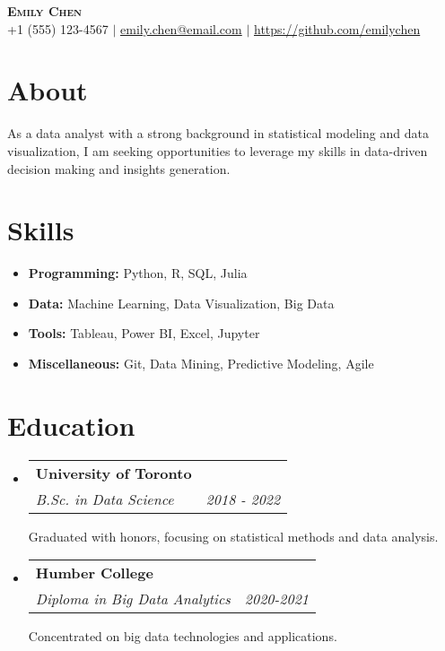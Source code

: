 \documentclass[letterpaper,11pt]{article}
\makeatletter
\newcommand{\resumeSubheading}[5]{
    \vspace{-2pt}\item
      \begin{tabular*}{0.97\textwidth}[t]{l@{\extracolsep{\fill}}r}
        \textbf{#1} & #2 \\
        \textit{\small#3} & \textit{\small #4} \\
      \end{tabular*}
      {#5}\\}
\newcommand{\resumeSubHeadingListStart}{\begin{itemize}[leftmargin=0.15in, label={}]}
\newcommand{\resumeSubHeadingListEnd}{\end{itemize}}
\newcommand{\resumeSkillsListStart}{\begin{itemize}[leftmargin=0.15in, label={}, noitemsep, topsep=0pt, partopsep=0pt]}
\makeatother
\begin{document}
  
  \begin{center}
  \textbf{\Huge \scshape Emily Chen} \\ \vspace{1pt}\small +1 (555) 123-4567 $|$ \href{mailto:emily.chen@email.com}{{emily.chen@email.com}} $|$ \href{https://github.com/emilychen}{{https://github.com/emilychen}}\end{center}
    \section{About}
    As a data analyst with a strong background in statistical modeling and data visualization, I am seeking opportunities to leverage my skills in data-driven decision making and insights generation.
    \section{Skills}
    \resumeSkillsListStart
        \item\textbf{Programming:} Python, R, SQL, Julia\\
\item\textbf{Data:} Machine Learning, Data Visualization, Big Data\\
\item\textbf{Tools:} Tableau, Power BI, Excel, Jupyter\\
\item\textbf{Miscellaneous:} Git, Data Mining, Predictive Modeling, Agile
    \resumeSubHeadingListEnd
    \section{Education}
    \resumeSubHeadingListStart
          \resumeSubheading
            {University of Toronto}{}
            {B.Sc. in Data Science}{2018 - 2022}{Graduated with honors, focusing on statistical methods and data analysis.}
          \resumeSubheading
            {Humber College}{}
            {Diploma in Big Data Analytics}{2020-2021}{Concentrated on big data technologies and applications.}
    \resumeSubHeadingListEnd
\end{document}
